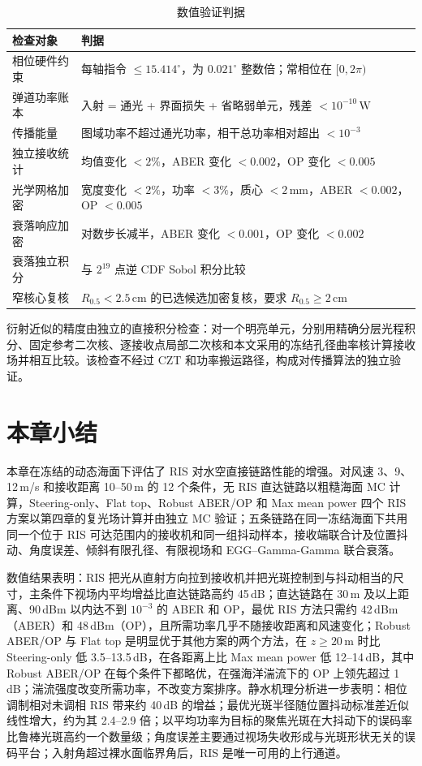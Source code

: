 \begin{table}[htbp]
\caption{数值验证判据}
\label{tab:c5_validation}
\centering
\begin{tabular}{ll}
\toprule
检查对象 & 判据 \\
\midrule
相位硬件约束 & 每轴指令 $\le15.414^\circ$，为 $0.021^\circ$ 整数倍；常相位在 $[0,2\pi)$ \\
弹道功率账本 & 入射 = 通光 + 界面损失 + 省略弱单元，残差 $<10^{-10}\,\mathrm W$ \\
传播能量 & 图域功率不超过通光功率，相干总功率相对超出 $<10^{-3}$ \\
独立接收统计 & 均值变化 $<2\%$，ABER 变化 $<0.002$，OP 变化 $<0.005$ \\
光学网格加密 & 宽度变化 $<2\%$，功率 $<3\%$，质心 $<2\,\mathrm{mm}$，ABER $<0.002$，OP $<0.005$ \\
衰落响应加密 & 对数步长减半，ABER 变化 $<0.001$，OP 变化 $<0.002$ \\
衰落独立积分 & 与 $2^{19}$ 点逆 CDF Sobol 积分比较 \\
窄核心复核 & $R_{0.5}<2.5\,\mathrm{cm}$ 的已选候选加密复核，要求 $R_{0.5}\ge2\,\mathrm{cm}$ \\
\bottomrule
\end{tabular}
\end{table}

衍射近似的精度由独立的直接积分检查：对一个明亮单元，分别用精确分层光程积分、固定参考二次核、逐接收点局部二次核和本文采用的冻结孔径曲率核计算接收场并相互比较。该检查不经过 CZT 和功率搬运路径，构成对传播算法的独立验证。

\section{本章小结}

本章在冻结的动态海面下评估了 RIS 对水空直接链路性能的增强。对风速 3、9、12\,m/s 和接收距离 10--50\,m 的 12 个条件，无 RIS 直达链路以粗糙海面 MC 计算，Steering-only、Flat top、Robust ABER/OP 和 Max mean power 四个 RIS 方案以第四章的复光场计算并由独立 MC 验证；五条链路在同一冻结海面下共用同一个位于 RIS 可达范围内的接收机和同一组抖动样本，接收端联合计及位置抖动、角度误差、倾斜有限孔径、有限视场和 EGG--Gamma-Gamma 联合衰落。

数值结果表明：RIS 把光从直射方向拉到接收机并把光斑控制到与抖动相当的尺寸，主条件下视场内平均增益比直达链路高约 45\,dB；直达链路在 30\,m 及以上距离、90\,dBm 以内达不到 $10^{-3}$ 的 ABER 和 OP，最优 RIS 方法只需约 42\,dBm（ABER）和 48\,dBm（OP），且所需功率几乎不随接收距离和风速变化；Robust ABER/OP 与 Flat top 是明显优于其他方案的两个方法，在 $z\ge20\,\mathrm m$ 时比 Steering-only 低 3.5--13.5\,dB，在各距离上比 Max mean power 低 12--14\,dB，其中 Robust ABER/OP 在每个条件下都略优，在强海洋湍流下的 OP 上领先超过 1\,dB；湍流强度改变所需功率，不改变方案排序。静水机理分析进一步表明：相位调制相对未调相 RIS 带来约 40\,dB 的增益；最优光斑半径随位置抖动标准差近似线性增大，约为其 2.4--2.9 倍；以平均功率为目标的聚焦光斑在大抖动下的误码率比鲁棒光斑高约一个数量级；角度误差主要通过视场失收形成与光斑形状无关的误码平台；入射角超过裸水面临界角后，RIS 是唯一可用的上行通道。
